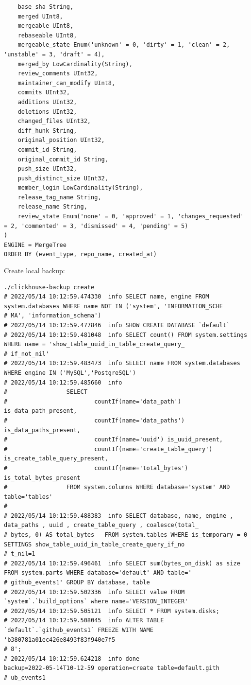 \begin{verbatim}
    base_sha String,
    merged UInt8,
    mergeable UInt8,
    rebaseable UInt8,
    mergeable_state Enum('unknown' = 0, 'dirty' = 1, 'clean' = 2, 'unstable' = 3, 'draft' = 4),
    merged_by LowCardinality(String),
    review_comments UInt32,
    maintainer_can_modify UInt8,
    commits UInt32,
    additions UInt32,
    deletions UInt32,
    changed_files UInt32,
    diff_hunk String,
    original_position UInt32,
    commit_id String,
    original_commit_id String,
    push_size UInt32,
    push_distinct_size UInt32,
    member_login LowCardinality(String),
    release_tag_name String,
    release_name String,
    review_state Enum('none' = 0, 'approved' = 1, 'changes_requested' = 2, 'commented' = 3, 'dismissed' = 4, 'pending' = 5)
)
ENGINE = MergeTree
ORDER BY (event_type, repo_name, created_at)
\end{verbatim}

Create local backup:
\begin{verbatim}
./clickhouse-backup create
# 2022/05/14 10:12:59.474330  info SELECT name, engine FROM system.databases WHERE name NOT IN ('system', 'INFORMATION_SCHE
# MA', 'information_schema')
# 2022/05/14 10:12:59.477846  info SHOW CREATE DATABASE `default`
# 2022/05/14 10:12:59.481048  info SELECT count() FROM system.settings WHERE name = 'show_table_uuid_in_table_create_query_
# if_not_nil'
# 2022/05/14 10:12:59.483473  info SELECT name FROM system.databases WHERE engine IN ('MySQL','PostgreSQL')
# 2022/05/14 10:12:59.485660  info
#                 SELECT
#                         countIf(name='data_path') is_data_path_present,
#                         countIf(name='data_paths') is_data_paths_present,
#                         countIf(name='uuid') is_uuid_present,
#                         countIf(name='create_table_query') is_create_table_query_present,
#                         countIf(name='total_bytes') is_total_bytes_present
#                 FROM system.columns WHERE database='system' AND table='tables'
#
# 2022/05/14 10:12:59.488383  info SELECT database, name, engine , data_paths , uuid , create_table_query , coalesce(total_
# bytes, 0) AS total_bytes   FROM system.tables WHERE is_temporary = 0 SETTINGS show_table_uuid_in_table_create_query_if_no
# t_nil=1
# 2022/05/14 10:12:59.496461  info SELECT sum(bytes_on_disk) as size FROM system.parts WHERE database='default' AND table='
# github_events1' GROUP BY database, table
# 2022/05/14 10:12:59.502336  info SELECT value FROM `system`.`build_options` where name='VERSION_INTEGER'
# 2022/05/14 10:12:59.505121  info SELECT * FROM system.disks;
# 2022/05/14 10:12:59.508045  info ALTER TABLE `default`.`github_events1` FREEZE WITH NAME 'b380781a01ec426e8493f83f940e7f5
# 8';
# 2022/05/14 10:12:59.624218  info done                      backup=2022-05-14T10-12-59 operation=create table=default.gith
# ub_events1
\end{verbatim}

